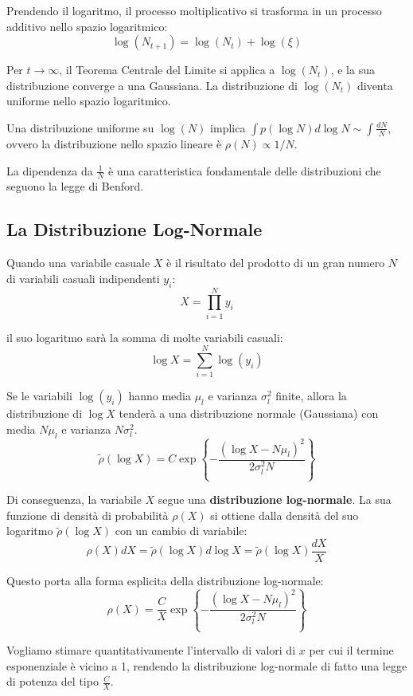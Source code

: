 Prendendo il logaritmo, il processo moltiplicativo si trasforma in un processo additivo nello spazio logaritmico:
\begin{equation}
\log(N_{t+1}) = \log(N_t) + \log(\xi)
\end{equation}

Per $t \to \infty$, il Teorema Centrale del Limite si applica a $\log(N_t)$, e la sua distribuzione converge a una Gaussiana. La distribuzione di $\log(N_t)$ diventa uniforme nello spazio logaritmico.

Una distribuzione uniforme su $\log(N)$ implica $\int p(\log N) d \log N \sim \int \frac{dN}{N}$, ovvero la distribuzione nello spazio lineare è $\rho(N) \propto 1/N$.

La dipendenza da $\frac{1}{N}$ è una caratteristica fondamentale delle distribuzioni che seguono la legge di Benford.

\subsection{La Distribuzione Log-Normale}

Quando una variabile casuale $X$ è il risultato del prodotto di un gran numero $N$ di variabili casuali indipendenti $y_i$:
$$X = \prod_{i=1}^{N} y_i$$

il suo logaritmo sarà la somma di molte variabili casuali:
$$\log X = \sum_{i=1}^{N} \log(y_i)$$

Se le variabili $\log(y_i)$ hanno media $\mu_l$ e varianza $\sigma_l^2$ finite, allora la distribuzione di $\log X$ tenderà a una distribuzione normale (Gaussiana) con media $N\mu_l$ e varianza $N\sigma_l^2$.
$$\tilde{\rho}(\log X) = C \exp\left\{-\frac{(\log X - N\mu_l)^2}{2\sigma_l^2 N}\right\}$$

Di conseguenza, la variabile $X$ segue una \textbf{distribuzione log-normale}. La sua funzione di densità di probabilità $\rho(X)$ si ottiene dalla densità del suo logaritmo $\tilde{\rho}(\log X)$ con un cambio di variabile:
$$\rho(X)dX = \tilde{\rho}(\log X) d\log X = \tilde{\rho}(\log X) \frac{dX}{X}$$

Questo porta alla forma esplicita della distribuzione log-normale:
$$\rho(X) = \frac{C}{X} \exp\left\{-\frac{(\log X - N\mu_l)^2}{2\sigma_l^2 N}\right\}$$

Vogliamo stimare quantitativamente l'intervallo di valori di $x$ per cui il termine esponenziale è vicino a 1, rendendo la distribuzione log-normale di fatto una legge di potenza del tipo $\frac{C}{X}$.

